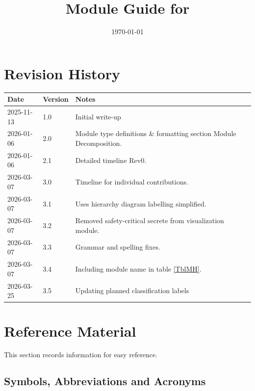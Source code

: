 \documentclass[12pt, titlepage]{article}
\begin{document}
\title{Module Guide for \progname{}} 
\author{\authname}
\date{\today}

\maketitle


\section{Revision History}

\begin{tabularx}{\textwidth}{p{3cm}p{2cm}X} \toprule {\bf Date} & {\bf Version}
& {\bf Notes}\\
\midrule
2025-11-13 & 1.0 & Initial write-up\\
2026-01-06 & 2.0 & Module type definitions \& formatting section Module
                   Decomposition.\\
2026-01-06 & 2.1 & Detailed timeline Rev0. \\
2026-03-07 & 3.0 & Timeline for individual contributions. \\
2026-03-07 & 3.1 & Uses hierarchy diagram labelling simplified. \\
2026-03-07 & 3.2 & Removed safety-critical secrete from visualization module.\\
2026-03-07 & 3.3 & Grammar and spelling fixes. \\
2026-03-07 & 3.4 & Including module name in table \ref{TblMH}.\\
2026-03-25 & 3.5 & Updating planned classification labels\\
\bottomrule
\end{tabularx}

\newpage

\section{Reference Material}

This section records information for easy reference.

\subsection{Symbols, Abbreviations and Acronyms}

\renewcommand{\arraystretch}{1.2}
\end{document}
